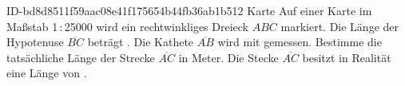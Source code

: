 \begin{exercise}
      {ID-bd8d8511f59aac08e41f175654b44fb36ab1b512}
      {Karte}
  \ifproblem\problem
    Auf einer Karte im Maßstab 1\,:\,\num{25000} wird ein rechtwinkliges Dreieck
    $ABC$ markiert. Die Länge der Hypotenuse $\overline{BC}$ beträgt .
    Die Kathete $\overline{AB}$ wird mit  gemessen. Bestimme die
    tatsächliche Länge der Strecke $\overline{AC}$ in Meter.
  \fi
  \ifoutcome\outcome
    Die Stecke $\overline{AC}$ besitzt in Realität eine Länge von .
  \fi
\end{exercise}
